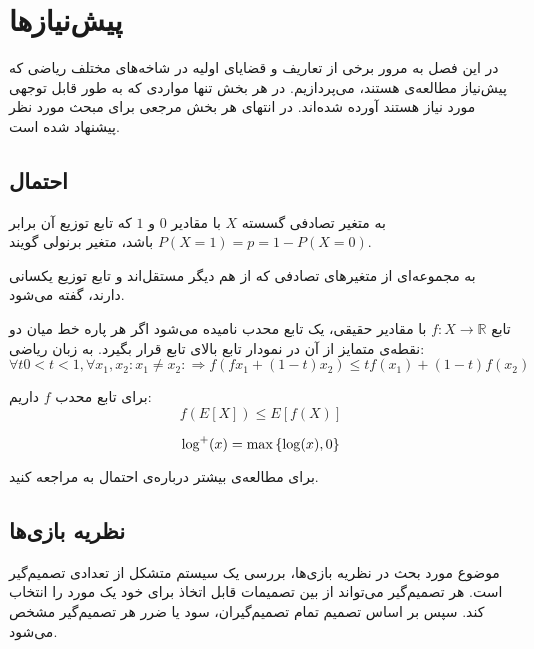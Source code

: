 \chapter{پیش‌نیازها}
\label{chapter:preliminaries}
در این فصل به مرور برخی از تعاریف و قضایای اولیه در شاخه‌های مختلف ریاضی که پیش‌نیاز مطالعه‌ی \picod هستند، می‌پردازیم. در هر بخش تنها مواردی که به طور قابل توجهی‌ مورد نیاز هستند آورده شده‌اند. در انتهای هر بخش مرجعی برای مبحث مورد نظر پیشنهاد شده است.
\section{احتمال}
\begin{definition}
	به متغیر تصادفی گسسته
	$X$
	با مقادیر
	$0$
	و
	$1$
	که تابع توزیع آن برابر
	$P(X = 1) = p = 1 - P(X = 0)$
	باشد، متغیر برنولی گویند.
\end{definition}
\begin{definition}
به مجموعه‌ای از متغیرهای تصادفی که از هم دیگر مستقل‌‌اند و تابع توزیع یکسانی دارند، گفته می‌شود.
\end{definition}
\begin{definition}
	تابع
	$f: X \rightarrow \mathbb{R}$
	با مقادیر حقیقی، یک تابع محدب نامیده می‌شود اگر هر پاره خط میان دو نقطه‌ی متمایز از آن در نمودار تابع بالای تابع قرار بگیرد. به زبان ریاضی:
	$$\forall t 0 < t < 1, \forall x_1, x_2: x_1 \ne x_2: \Rightarrow f(f x_1 + (1 - t) x_2) \leq tf(x_1) + (1 - t) f(x_2)$$
\end{definition}
\begin{theorem}
	\label{Jensen}
	برای تابع محدب
	$f$
	داریم:
	$$f(E[X]) \leq E[f(X)]$$
\end{theorem}
\begin{notation}[$\log^{+}$]
	$$\log^{+}(x) = \max\left\{ \log(x), 0 \right\}$$
\end{notation}
برای مطالعه‌ی بیشتر درباره‌ی احتمال به
\cite{book:pro}
مراجعه کنید.
\section{نظریه بازی‌ها}
موضوع مورد بحث در نظریه بازی‌ها، بررسی یک سیستم متشکل از تعدادی تصمیم‌گیر است. هر تصمیم‌گیر می‌تواند از بین تصمیمات قابل اتخاذ برای خود یک مورد را انتخاب کند. سپس بر اساس تصمیم تمام تصمیم‌گیران، سود یا ضرر هر تصمیم‌گیر مشخص می‌شود.

